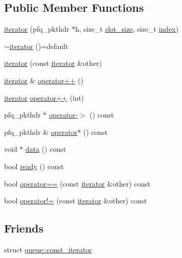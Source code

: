 \subsection*{Public Member Functions}
\begin{DoxyCompactItemize}
\item 
\hyperlink{structpfq_1_1queue_1_1iterator_a9b65e97aad657c89705e4961d065547d}{iterator} (pfq\+\_\+pkthdr $\ast$h, size\+\_\+t \hyperlink{classpfq_1_1queue_aa8ec2b1bd7c4fb2ec924f356c95b81ae}{slot\+\_\+size}, size\+\_\+t \hyperlink{classpfq_1_1queue_a6eec9332ce5248055b03376855469087}{index})
\item 
\hyperlink{structpfq_1_1queue_1_1iterator_a11625bbe8c9b064e8545e7aa73f15bae}{$\sim$iterator} ()=default
\item 
\hyperlink{structpfq_1_1queue_1_1iterator_a034960aa0288d1dc170f71aafeeaceb3}{iterator} (const \hyperlink{structpfq_1_1queue_1_1iterator}{iterator} \&other)
\item 
\hyperlink{structpfq_1_1queue_1_1iterator}{iterator} \& \hyperlink{structpfq_1_1queue_1_1iterator_a65b4b523ec7278c109b9352ca2be0fff}{operator++} ()
\item 
\hyperlink{structpfq_1_1queue_1_1iterator}{iterator} \hyperlink{structpfq_1_1queue_1_1iterator_abdd87f1bfeaa729009780289d9db536a}{operator++} (int)
\item 
pfq\+\_\+pkthdr $\ast$ \hyperlink{structpfq_1_1queue_1_1iterator_a4b233d002bc97eb647077bd69a872fa0}{operator-\/$>$} () const 
\item 
pfq\+\_\+pkthdr \& \hyperlink{structpfq_1_1queue_1_1iterator_acdb50c9d9900d722c49402495c0829c0}{operator$\ast$} () const 
\item 
void $\ast$ \hyperlink{structpfq_1_1queue_1_1iterator_aef27d796bf1a5155c61e408948deead5}{data} () const 
\item 
bool \hyperlink{structpfq_1_1queue_1_1iterator_a5310a5b6b8eb89892a2b30d4707e3934}{ready} () const 
\item 
bool \hyperlink{structpfq_1_1queue_1_1iterator_a49691cbc49f5cf1836ea405fbaa3775a}{operator==} (const \hyperlink{structpfq_1_1queue_1_1iterator}{iterator} \&other) const 
\item 
bool \hyperlink{structpfq_1_1queue_1_1iterator_a8f23e1ed07479277fb48cb2c8d4d91f9}{operator!=} (const \hyperlink{structpfq_1_1queue_1_1iterator}{iterator} \&other) const 
\end{DoxyCompactItemize}
\subsection*{Friends}
\begin{DoxyCompactItemize}
\item 
struct \hyperlink{structpfq_1_1queue_1_1iterator_a58a3589426e806d3416f369707f00b70}{queue\+::const\+\_\+iterator}
\end{DoxyCompactItemize}


